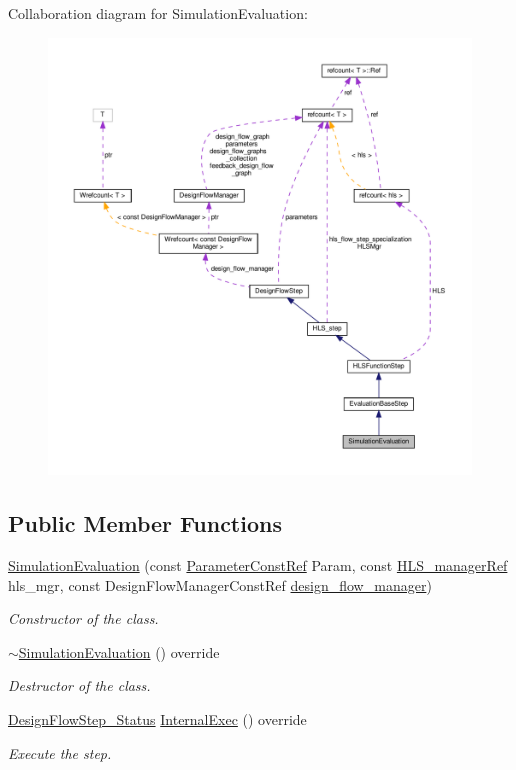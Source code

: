 Collaboration diagram for Simulation\+Evaluation\+:
\nopagebreak
\begin{figure}[H]
\begin{center}
\leavevmode
\includegraphics[width=350pt]{db/dfb/classSimulationEvaluation__coll__graph}
\end{center}
\end{figure}
\subsection*{Public Member Functions}
\begin{DoxyCompactItemize}
\item 
\hyperlink{classSimulationEvaluation_a9a6181408bb5dc0db7490adb3bb75efd}{Simulation\+Evaluation} (const \hyperlink{Parameter_8hpp_a37841774a6fcb479b597fdf8955eb4ea}{Parameter\+Const\+Ref} Param, const \hyperlink{hls__manager_8hpp_acd3842b8589fe52c08fc0b2fcc813bfe}{H\+L\+S\+\_\+manager\+Ref} hls\+\_\+mgr, const Design\+Flow\+Manager\+Const\+Ref \hyperlink{classDesignFlowStep_ab770677ddf087613add30024e16a5554}{design\+\_\+flow\+\_\+manager})
\begin{DoxyCompactList}\small\item\em Constructor of the class. \end{DoxyCompactList}\item 
\hyperlink{classSimulationEvaluation_aecec6c909c3c017be7ed1e65f23f8452}{$\sim$\+Simulation\+Evaluation} () override
\begin{DoxyCompactList}\small\item\em Destructor of the class. \end{DoxyCompactList}\item 
\hyperlink{design__flow__step_8hpp_afb1f0d73069c26076b8d31dbc8ebecdf}{Design\+Flow\+Step\+\_\+\+Status} \hyperlink{classSimulationEvaluation_a08fa888750e787c0e4cdf88efcd50a8f}{Internal\+Exec} () override
\begin{DoxyCompactList}\small\item\em Execute the step. \end{DoxyCompactList}\end{DoxyCompactItemize}
